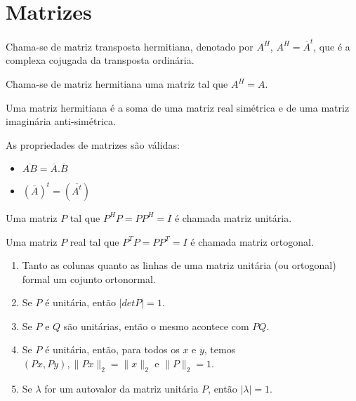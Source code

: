 \documentclass[10pt,a4paper]{article}
\begin{document}
\section{Matrizes}

\begin{definition}
Chama-se de matriz transposta hermitiana, denotado por $A^H$, $A^H = \overline{A}^t$, que é a complexa cojugada da transposta ordinária.
\end{definition}

\begin{definition}
Chama-se de matriz hermitiana uma matriz tal que $A^H = A$.
\end{definition}

\begin{lemma}
Uma matriz hermitiana é a soma de uma matriz real simétrica e de uma matriz imaginária anti-simétrica.
\end{lemma}

\begin{lemma}
As propriedades de matrizes são válidas:
	\begin{itemize}
		\item $\overline{AB} = \overline{A}.\overline{B}$
		\item $(\overline{A})^t = (\overline{A^t})$
	\end{itemize}
\end{lemma}

\begin{definition}
	Uma matriz $P$ tal que $P^HP = PP^H = I$ é chamada matriz unitária. 
\end{definition}

\begin{definition}
	Uma matriz $P$ real tal que $P^TP = PP^T = I$ é chamada matriz ortogonal.
\end{definition}

\begin{theorem}
	\begin{enumerate}[label=(\roman*)]
		\item Tanto as colunas quanto as linhas de uma matriz unitária (ou ortogonal) formal um cojunto ortonormal.
		\item Se $P$ é unitária, então $|det P| = 1$.
		\item Se $P$ e $Q$ são unitárias, então o mesmo acontece com $PQ$.
		\item Se $P$ é unitária, então, para todos os $x$ e $y$, temos $(Px, Py), \lVert Px \rVert_2 = \lVert x \rVert_2$ e $\lVert P \rVert_2 = 1$.
		\item Se $\lambda$ for um autovalor da matriz unitária $P$, então $|\lambda| = 1$.
	\end{enumerate}
\end{theorem}
\end{document}
